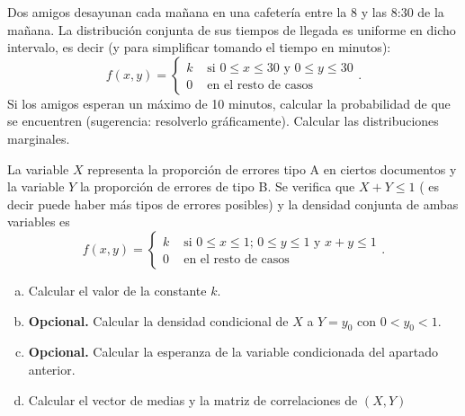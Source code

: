 \documentclass[12pt]{article}
\begin{document}
\begin{prob}
 Dos amigos desayunan cada mañana en una cafetería entre la 8 y las 8:30 de la mañana. La
distribución  conjunta de sus tiempos de llegada es uniforme en dicho intervalo, es decir
(y para simplificar tomando el tiempo en minutos):
$$f(x,y)=\left\{\begin{array}{ll}
k  & \mbox{ si } 0\leq x \leq 30 \mbox{ y } 0\leq y \leq 30\\ 0 & \mbox{ en el resto de
casos}
\end{array}\right. .$$
Si los amigos esperan un máximo de 10 minutos, calcular la probabilidad de que se
encuentren (sugerencia: resolverlo gráficamente). Calcular las distribuciones marginales.

\end{prob}


\begin{prob}
La variable $X$ representa la proporción de errores tipo A en ciertos documentos y la
variable $Y$ la proporción de errores de tipo B. Se verifica que $X+Y\leq 1$ ( es decir
puede haber más tipos de errores posibles) y la densidad conjunta de ambas variables es
$$f(x,y)=\left\{\begin{array}{ll}
k  & \mbox{ si } 0\leq x \leq 1\mbox{; } 0\leq y\leq 1\mbox{ y } x+y\leq 1\\ 0 & \mbox{ en
el resto de casos}
\end{array}\right. .$$
\begin{enumerate}[a)]
\item Calcular el valor de la constante $k$.
\item \textbf{Opcional.} Calcular la densidad condicional de $X$ a $Y=y_{0}$  con
$0<y_{0}<1$.
\item \textbf{Opcional.}  Calcular la esperanza de la variable condicionada del
apartado anterior.
\item Calcular el vector de medias y  la matriz de correlaciones de $(X,Y)$
\end{enumerate}
\end{prob}
\end{document}
